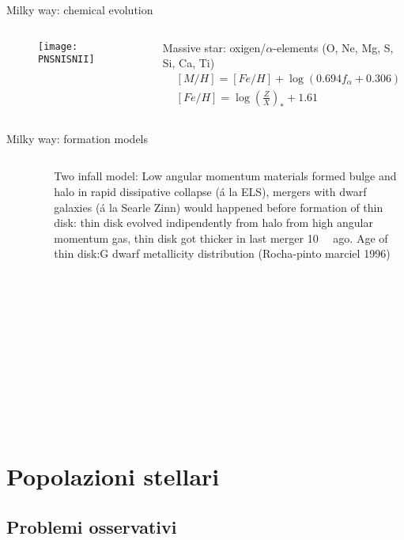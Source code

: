 \begin{frame}{Milky way: chemical evolution}
\begin{columns}[T]
\begin{column}{0.5\textwidth}
\begin{figure}[!ht]\texttt{[image: PNSNISNII]}\label{fig:PNSNISNII}
\end{figure}
\end{column}
\begin{column}{0.5\textwidth}
Massive star: oxigen/$\alpha$-elements (O, Ne, Mg, S, Si, Ca, Ti)
\begin{align*}
&[M/H]=[Fe/H]+\log{(0.694f_{\alpha}+0.306)}\\
&[Fe/H]=\log{(\frac{Z}{X})_*}+1.61
\end{align*}
\end{column}
\end{columns}
\end{frame}

\begin{frame}{Milky way: formation models}
\begin{columns}[T]
\begin{column}{0.4\textwidth}
\begin{figure}[!ht]\texttt{[image: MWformation]}\label{fig:MWformation}
\end{figure}
\end{column}
\begin{column}{0.6\textwidth}
Two infall model: Low angular momentum materials formed bulge and halo in rapid dissipative collapse (\'a la ELS), mergers with dwarf galaxies (\'a la Searle Zinn) would happened before formation of thin disk: thin disk evolved indipendently from halo from high angular momentum gas, thin disk got thicker in last merger \SI{10}{\giga\year} ago.
Age of thin disk:G dwarf metallicity distribution (Rocha-pinto marciel 1996)
\end{column}
\end{columns}
\end{frame}

\section{Popolazioni stellari}

\subsection{Problemi osservativi}


